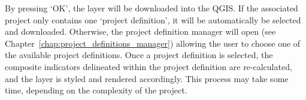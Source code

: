 By pressing `OK', the layer will be downloaded into the QGIS\@. If the associated
project only contains one `project definition', it will be automatically be
selected and downloaded. Otherwise, the project definition manager will open
(see Chapter~\ref{chap:project_definitions_manager}) allowing the user to choose
one of the available project definitions. Once a project definition is
selected, the composite indicators delineated within the project definition are
re-calculated, and the layer is styled and rendered accordingly. This process
may take some time, depending on the complexity of the project.
